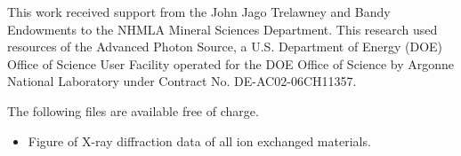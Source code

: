 \documentclass[journal=acsodf,manuscript=article]{achemso}
\begin{document}


\begin{acknowledgement}
{\label{acknowledgement}}

This work received support from the John Jago Trelawney and Bandy
Endowments to the NHMLA Mineral Sciences Department.  This research used resources of the Advanced Photon Source,
a U.S. Department of Energy (DOE) Office of Science User Facility
operated for the DOE Office of Science by Argonne National Laboratory
under Contract No. DE-AC02-06CH11357.

\end{acknowledgement}

\begin{suppinfo}

The following files are available free of charge.
\begin{itemize}
  \item Figure of X-ray diffraction data of all ion exchanged materials.
\end{itemize}

\end{suppinfo}



\end{document}
